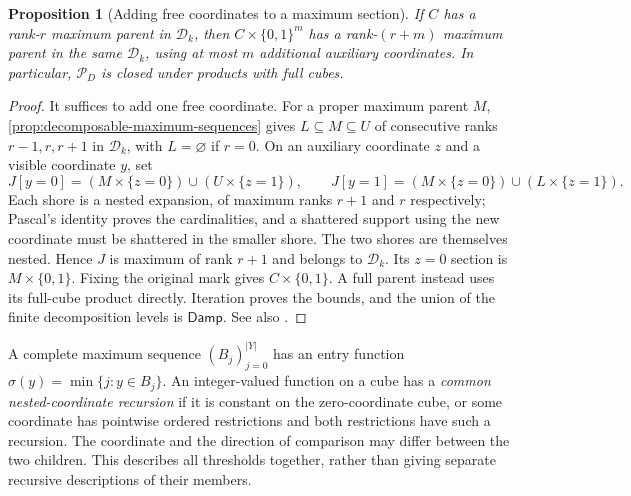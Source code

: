 \documentclass[11pt]{article}
\newtheorem{proposition}{Proposition}[section]
\theoremstyle{definition}
\newcommand{\bits}{\{0,1\}}
\newcommand{\Damp}{\mathsf{Damp}}
\begin{document}
\begin{proposition}[Adding free coordinates to a maximum section]
\label{prop:parent-free-coordinates}
If $C$ has a rank-$r$ maximum parent in $\mathcal D_k$, then
$C\times\bits^m$ has a rank-$(r+m)$ maximum parent in the same
$\mathcal D_k$, using at most $m$ additional auxiliary coordinates.
In particular, $\mathcal P_D$ is closed under products with full cubes.
\end{proposition}
\begin{proof}
It suffices to add one free coordinate. For a proper maximum parent $M$,
\cref{prop:decomposable-maximum-sequences} gives $L\subseteq M\subseteq U$
of consecutive ranks $r-1,r,r+1$ in $\mathcal D_k$, with $L=\varnothing$
if $r=0$. On an auxiliary coordinate $z$ and a visible coordinate $y$, set
\[
 J[y=0]=(M\times\{z=0\})\cup(U\times\{z=1\}),\qquad
 J[y=1]=(M\times\{z=0\})\cup(L\times\{z=1\}).
\]
Each shore is a nested expansion, of maximum ranks $r+1$ and $r$
respectively; Pascal's identity proves the cardinalities, and a shattered
support using the new coordinate must be shattered in the smaller shore.
The two shores are themselves nested. Hence $J$ is maximum of rank $r+1$
and belongs to $\mathcal D_k$. Its $z=0$ section is $M\times\bits$.
Fixing the original mark gives $C\times\bits$. A full parent instead
uses its full-cube product directly. Iteration proves the bounds, and the
union of the finite decomposition levels is $\Damp$. See also \cite{Structural984}.
\end{proof}

A complete maximum sequence $(B_j)_{j=0}^{|Y|}$ has an entry function
$\sigma(y)=\min\{j:y\in B_j\}$. An integer-valued function on a cube
has a \emph{common nested-coordinate recursion} if it is constant on the
zero-coordinate cube, or some coordinate has pointwise ordered restrictions
and both restrictions have such a recursion. The coordinate and the direction
of comparison may differ between the two children. This describes all
thresholds together, rather than giving separate recursive descriptions of
their members.
\end{document}
